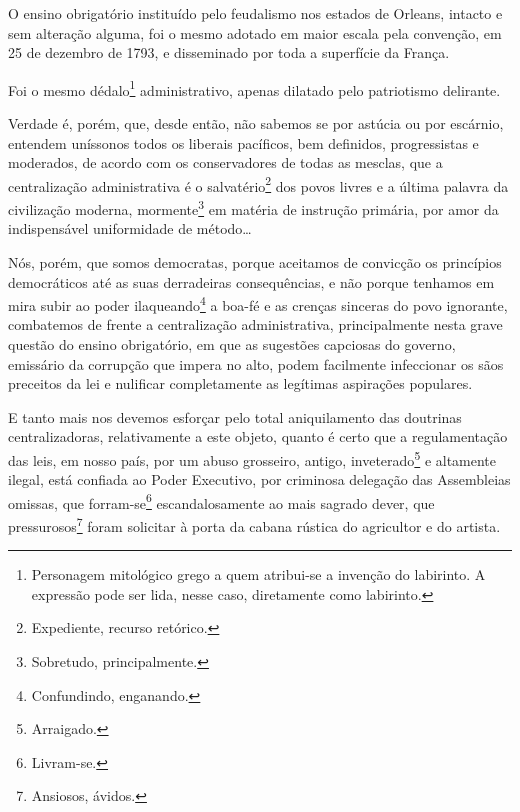 O ensino obrigatório instituído pelo feudalismo nos estados de Orleans,
intacto e sem alteração alguma, foi o mesmo adotado em maior escala pela
convenção, em 25 de dezembro de 1793, e disseminado por toda a
superfície da França.

Foi o mesmo dédalo\footnote{Personagem mitológico grego a quem
  atribui-se a invenção do labirinto. A expressão pode ser lida, nesse
  caso, diretamente como labirinto.} administrativo, apenas dilatado
pelo patriotismo delirante.

Verdade é, porém, que, desde então, não sabemos se por astúcia ou por
escárnio, entendem uníssonos todos os liberais pacíficos, bem definidos,
progressistas e moderados, de acordo com os conservadores de todas as
mesclas, que a centralização administrativa é o salvatério\footnote{
  Expediente, recurso retórico.} dos povos livres e a última palavra da
civilização moderna, mormente\footnote{Sobretudo, principalmente.} em
matéria de instrução primária, por amor da indispensável uniformidade de
método\ldots{}

Nós, porém, que somos democratas, porque aceitamos de convicção os
princípios democráticos até as suas derradeiras consequências, e não
porque tenhamos em mira subir ao poder ilaqueando\footnote{
  Confundindo, enganando.} a boa-fé e as crenças sinceras do povo
ignorante, combatemos de frente a centralização administrativa,
principalmente nesta grave questão do ensino obrigatório, em que as
sugestões capciosas do governo, emissário da corrupção que impera no
alto, podem facilmente infeccionar os sãos preceitos da lei e nulificar
completamente as legítimas aspirações populares.

E tanto mais nos devemos esforçar pelo total aniquilamento das doutrinas
centralizadoras, relativamente a este objeto, quanto é certo que a
regulamentação das leis, em nosso país, por um abuso grosseiro, antigo,
inveterado\footnote{Arraigado.} e altamente ilegal, está confiada ao
Poder Executivo, por criminosa delegação das Assembleias omissas, que
forram-se\footnote{Livram-se.} escandalosamente ao mais sagrado dever,
que pressurosos\footnote{Ansiosos, ávidos.} foram solicitar à porta da
cabana rústica do agricultor e do artista.

